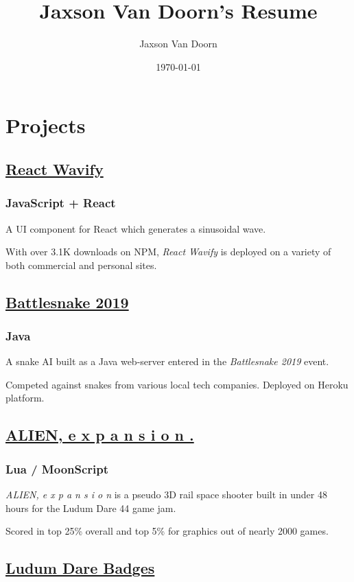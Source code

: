 \documentclass[letterpaper]{article}
\author{Jaxson Van Doorn}
\date{\today}
\title{Jaxson Van Doorn's Resume}
\begin{document}
 
\section{Projects}
\label{sec:org96cf531}
\subsection{\href{https://github.com/woofers/react-wavify}{React Wavify}}
\label{sec:org159deac}
\subsubsection{JavaScript + React}
\label{sec:org63dfc3b}
A UI component for React which generates a sinusoidal wave.

With over 3.1K downloads on NPM, \emph{React Wavify} is deployed on a variety of both commercial and personal sites.
\subsection{\href{https://github.com/woofers/battlesnake-2019}{Battlesnake 2019}}
\label{sec:org7557602}
\subsubsection{Java}
\label{sec:orgcea190c}
A snake AI built as a Java web-server entered in the \emph{Battlesnake 2019} event.

Competed against snakes from various local tech companies.  Deployed on Heroku platform.

\subsection{\href{https://github.com/woofers/ludum-dare-44}{ALIEN, e x p a n s i o n .}}
\label{sec:org91d3220}
\subsubsection{Lua / MoonScript}
\label{sec:orge387836}
\emph{ALIEN, e x p a n s i o n} is a pseudo 3D rail space shooter built in under 48 hours for the Ludum Dare 44 game jam.

Scored in top 25\% overall and top 5\% for graphics out of nearly 2000 games.

\subsection{\href{https://github.com/woofers/ludum-dare-badges}{Ludum Dare Badges}}
\label{sec:orgb453821}
\end{document}
